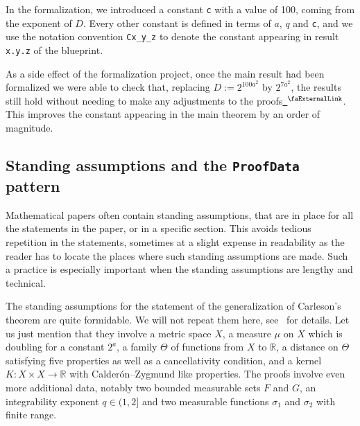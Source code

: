 \documentclass[12pt]{amsart}
\newcommand{\lean}[1]{\lstinline{#1}}
\newcommand*{\real}{\mathbb{R}} %
\newcommand{\extlink}{~\ensuremath{{}^\text{\faExternalLink}}}
\theoremstyle{definition}
\theoremstyle{plain}
\begin{document}
In the formalization, we introduced a constant \lean{c} with a value of 100, coming from the exponent of $D$.
Every other constant is defined in terms of $a$, $q$ and \lean{c}, and we use the notation convention \lean{Cx_y_z} to denote the constant appearing in result \lean{x.y.z} of the blueprint.

As a side effect of the formalization project, once the main result had been formalized we were able to check that, replacing $D := 2^{100a^2}$ by $2^{7a^2}$, the results still hold without needing to make any adjustments to the proofs\href{https://github.com/fpvandoorn/carleson/blob/32d3284ce04e16118646f222e63e034930434e80/Carleson/DoublingMeasure.lean#L25-L36}{\extlink}. This improves the constant appearing in the main theorem by an order of magnitude.


\subsection{Standing assumptions and the \texttt{ProofData} pattern}\label{subsec:proof_data}

Mathematical papers often contain standing assumptions, that are in place for
all the statements in the paper, or in a specific section. This avoids
tedious repetition in the statements, sometimes at a slight expense in
readability as the reader has to locate the places where such standing
assumptions are made. Such a practice is especially important when the
standing assumptions are lengthy and technical.

The standing assumptions for the statement of the generalization of
Carleson's theorem are quite formidable. We will not repeat them here,
see~\cite[Theorem~1.1.1]{CarlesonBlueprint} for details. Let us just mention
that they involve a metric space $X$, a measure $\mu$ on $X$ which is
doubling for a constant $2^a$, a family $\Theta$ of functions from $X$ to
$\real$, a distance on $\Theta$ satisfying five properties as well as a
cancellativity condition, and a kernel $K\colon X \times X \to \real$ with
Calderón--Zygmund like properties. The proofs involve even more additional
data, notably two bounded measurable sets $F$ and $G$, an integrability
exponent $q\in (1, 2]$ and two measurable functions $\sigma_1$ and
$\sigma_2$ with finite range.
\end{document}
